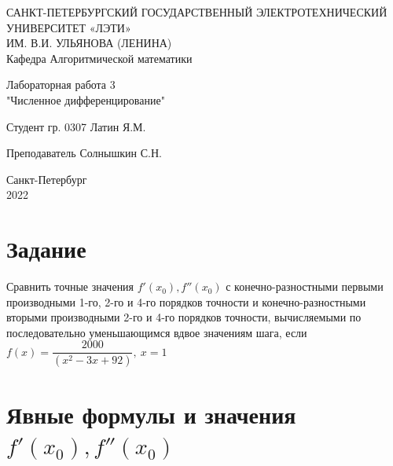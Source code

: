 \documentclass{article}
\begin{document}
	
	\begin{titlepage}
		
		\begin{center}
			САНКТ-ПЕТЕРБУРГСКИЙ ГОСУДАРСТВЕННЫЙ ЭЛЕКТРОТЕХНИЧЕСКИЙ УНИВЕРСИТЕТ «ЛЭТИ» \\ИМ. В.И. УЛЬЯНОВА (ЛЕНИНА)\\
			\vspace{0.1cm}
			Кафедра Алгоритмической математики\\
			
			
			
		\end{center}
		
		\vspace{5cm}
		\begin{center}
			\begin{large}
				Лабораторная работа 3 \\
				"Численное дифференцирование"
			\end{large}
		\end{center}
		
		\vspace{5cm}
		
		\hspace{5cm} Студент гр.  0307 \hrulefill Латин Я.М.
		
		\vspace{0.5cm}
		\hspace{5cm} Преподаватель \hrulefill  Солнышкин С.Н.\\
		
		
		\vfill
		\begin{center}
			Санкт-Петербург\\
			2022
		\end{center}
		
		
	\end{titlepage}
	
	
	\newpage
	\tableofcontents
	\newpage
	\section{Задание}
	Сравнить точные значения $ f'(x_0), f''(x_0) $ с конечно-разностными первыми производными 1-го, 2-го и 4-го порядков точности и конечно-разностными вторыми производными 2-го и 4-го порядков точности, вычисляемыми по последовательно уменьшающимся вдвое значениям шага, если
	\( f(x)=\dfrac{2000}{(x^2-3x+92)},~x = 1 \)
	
	\section{Явные формулы и значения $ f'(x_0), f''(x_0) $}
	
\end{document}

